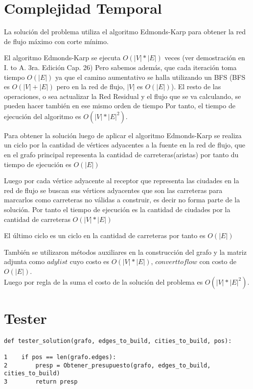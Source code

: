 \documentclass[runningheads,a4paper]{llncs}
\begin{document}
{\newpage
\section{Complejidad Temporal}
La soluci\'on del problema utiliza el algoritmo Edmonds-Karp para obtener la red de flujo m\'aximo con corte m\'inimo. 

El algoritmo Edmonds-Karp se ejecuta $O(|V|*|E|)$ veces (ver demostraci\'on en I. to A. 3ra. Edición Cap. 26)
Pero sabemos adem\'as, que cada iteraci\'on toma tiempo $ O(|E|)$ ya que el camino aumentativo se halla utilizando un BFS (BFS es $O(|V|+|E|)$ pero en la red de flujo, $|V|$ es $O(|E|)$). El resto de las operaciones, o sea actualizar la Red Residual y el flujo que se va calculando, se pueden hacer tambi\'en en ese mismo orden de tiempo
Por tanto,
el tiempo de ejecuci\'on del algoritmo es $O(|V|*{|E|}^2)$.

Para obtener la soluci\'on luego de aplicar el algoritmo Edmonds-Karp se realiza un ciclo por la cantidad de v\'ertices adyacentes a la fuente en la red de flujo, que en el grafo principal representa la cantidad de carreteras(aristas) por tanto du tiempo de ejecuci\'on es $O(|E|)$

Luego por cada v\'ertice adyacente al receptor que representa las ciudades en la red de flujo se buscan sus v\'ertices adyacentes que son las carreteras para marcarlos como carreteras no v\'alidas a construir, es decir no forma parte de la soluci\'on. Por tanto el tiempo de ejecuci\'on es la cantidad de ciudades por la cantidad de carreteras  $O(|V|*|E|)$

El \'ultimo ciclo es un ciclo en la cantidad de carreteras por tanto es $O(|E|)$

Tambi\'en se utilizaron m\'etodos auxiliares en la construcci\'on del grafo y la matriz adjunta como $ady list$ cuyo costo es $O(|V|*|E|)$, $convert to flow$ con costo de $O(|E|)$.\\

Luego por regla de la suma el costo de la soluci\'on del problema es $O(|V|*{|E|}^2)$.

\newpage
\section{Tester}
\begin{lstlisting}
def tester_solution(grafo, edges_to_build, cities_to_build, pos):

1    if pos == len(grafo.edges):
2        presp = Obtener_presupuesto(grafo, edges_to_build, cities_to_build)
3        return presp


\end{lstlisting}}
\end{document}
